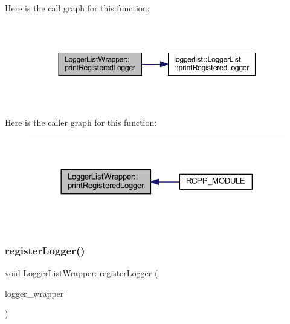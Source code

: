 Here is the call graph for this function\+:\nopagebreak
\begin{figure}[H]
\begin{center}
\leavevmode
\includegraphics[width=344pt]{class_logger_list_wrapper_a9b23823777868fc0f0e9778f7eb48fcf_cgraph}
\end{center}
\end{figure}
Here is the caller graph for this function\+:\nopagebreak
\begin{figure}[H]
\begin{center}
\leavevmode
\includegraphics[width=317pt]{class_logger_list_wrapper_a9b23823777868fc0f0e9778f7eb48fcf_icgraph}
\end{center}
\end{figure}
\mbox{\label{class_logger_list_wrapper_a428932ced69ba53f256b832a94563524}} 
\subsubsection{\texorpdfstring{register\+Logger()}{registerLogger()}}
{\footnotesize\ttfamily void Logger\+List\+Wrapper\+::register\+Logger (\begin{DoxyParamCaption}\item[{\mbox{\hyperlink{class_logger_wrapper}{Logger\+Wrapper}} \&}]{logger\+\_\+wrapper }\end{DoxyParamCaption})\hspace{0.3cm}{\ttfamily [inline]}}

